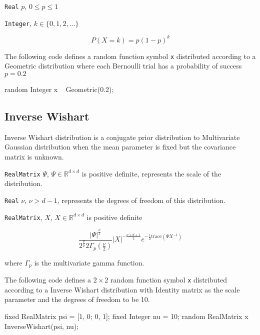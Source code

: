 \begin{itemize*}
\item[] \verb|Real|
 $p$, $0 \leq p \leq 1$
\end{itemize*}

\begin{itemize*}
\item[] \verb|Integer|, $k \in \{0, 1, 2, \ldots \}$
\end{itemize*}

\[
	P(X = k) = p(1-p)^{k}
\]

The following code defines a random function symbol \verb|x| distributed according to a Geometric distribution where each Bernoulli trial has a probability of success $p = 0.2$
\begin{blogcode}
random Integer x ~ Geometric(0.2);
\end{blogcode}

\subsection{Inverse Wishart}
Inverse Wishart distribution is a conjugate prior distribution to Multivariate Gaussian distribution when the mean parameter is fixed but the covariance matrix is unknown.

\begin{itemize*}
\item[] \verb|RealMatrix| $\Psi$, $\Psi\in\mathbb R^{d\times d}$ is positive definite, represents the scale of the distribution.
\item[] \verb|Real| $\nu$, $\nu > d - 1$, represents the degrees of freedom of this distribution.
\end{itemize*}

\begin{itemize*}
\item[] \verb|RealMatrix|, $X$, $X\in\mathbb R^{d\times d}$ is positive definite
\end{itemize*}

\[
	\frac{|\Psi|^{\frac\nu2}}{2^{\frac\nu p}{2}\Gamma_p(\frac\nu2)}|X|^{-\frac{\nu+d+1}{2}}e^{-\frac12\text{trace}(\Psi X^{-1})}
\]

where $\Gamma_p$ is the multivariate gamma function.

The following code defines a $2\times2$ random function symbol \verb|x| distributed according to a Inverse Wishart distribution with Identity matrix as the scale parameter and the degrees of freedom to be 10.
\begin{blogcode}
fixed RealMatrix psi = [1, 0; 0, 1];
fixed Integer nu = 10;
random RealMatrix x ~ InverseWishart(psi, nu);
\end{blogcode}

